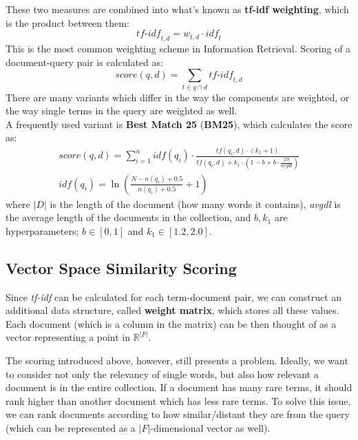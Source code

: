 These two measures are combined into what's known as \textbf{tf-idf weighting}, which is the product between them:
\begin{equation*}
    \textit{tf-idf}_{t,d} = w_{t,d} \cdot \textit{idf}_t
\end{equation*}
This is the most common weighting scheme in Information Retrieval. Scoring of a document-query pair is calculated as:
\begin{equation*}
    \textit{score}(q,d) = \sum_{t \in q \cap d} \textit{tf-idf}_{t,d}
\end{equation*}
There are many variants which differ in the way the components are weighted, or the way single terms in the query are weighted as well. \\
A frequently used variant is \textbf{Best Match 25} (\textbf{BM25}), which calculates the score as:
\begin{gather*}
    \textit{score}(q,d) = \sum_{i=1}^n \textit{idf}(q_i) \cdot \frac{tf(q_i, d) \cdot (k_1 + 1)}{tf(q_i, d) + k_1 \cdot (1 - b + b \cdot \frac{|D|}{\textit{avgdl}})} \\
    \textit{idf}(q_i) = \ln \left( \frac{N - n(q_i) + 0.5}{n(q_i) + 0.5} + 1 \right)
\end{gather*}
where $|D|$ is the length of the document (how many words it contains), \textit{avgdl} is the average length of the documents in the collection, and $b, k_1$ are hyperparameters; $b \in [0,1]$ and $k_1 \in [1.2,2.0]$.

\subsection{Vector Space Similarity Scoring}

Since \textit{tf-idf} can be calculated for each term-document pair, we can construct an additional data structure, called \textbf{weight matrix}, which stores all these values. Each document (which is a column in the matrix) can be then thought of as a vector representing a point in $\mathbb{R}^{|F|}$.

The scoring introduced above, however, still presents a problem. Ideally, we want to consider not only the relevancy of single words, but also how relevant a document is in the entire collection. If a document has many rare terms, it should rank higher than another document which has less rare terms. To solve this issue, we can rank  documents according to how similar/distant they are from the query (which can be represented as a $|F|$-dimensional vector as well).

